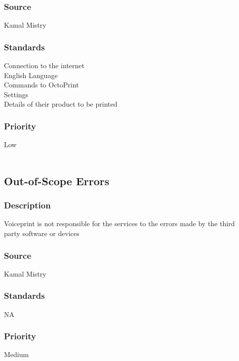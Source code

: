\subsubsection{Source}
Kamal Mistry
\subsubsection{Standards}
Connection to the internet\\
English Language\\
Commands to OctoPrint\\
Settings\\
Details of their product to be printed
\subsubsection{Priority}
Low
\\
\\
\subsection{Out-of-Scope Errors}
\subsubsection{Description}
Voiceprint is not responsible for the services to the errors made by the third party software or devices
\subsubsection{Source}
Kamal Mistry
\subsubsection{Standards}
NA
\subsubsection{Priority}
Medium
